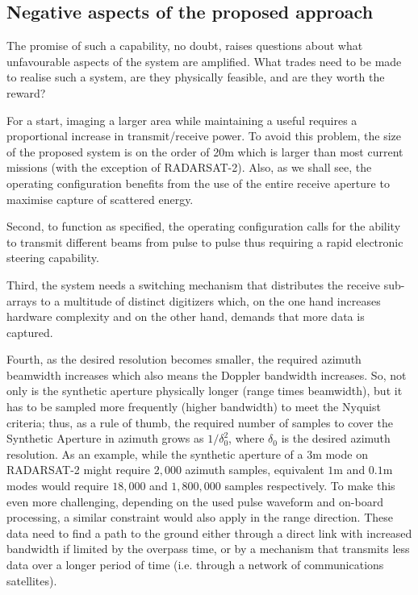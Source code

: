 \subsection{Negative aspects of the proposed approach}
The promise of such a capability, no doubt, raises questions about what unfavourable aspects of the system are amplified. What trades need to be made to realise such a system, are they physically feasible, and are they worth the reward? 
\par
For a start, imaging a larger area while maintaining a useful  requires a proportional increase in transmit/receive power. To avoid this problem, the size of the proposed system is on the order of 20m which is larger than most current missions (with the exception of RADARSAT-2). Also, as we shall see, the operating configuration benefits from the use of the entire receive aperture to maximise capture of scattered energy. 
\par
Second, to function as specified, the operating configuration calls for the ability to transmit different beams from pulse to pulse thus requiring a rapid electronic steering capability. 
\par
Third, the system needs a switching mechanism that distributes the receive sub-arrays to a multitude of distinct digitizers which, on the one hand increases hardware complexity and on the other hand, demands that more data is captured. 
\par
Fourth, as the desired resolution becomes smaller, the required azimuth beamwidth increases which also means the Doppler bandwidth increases. So, not only is the synthetic aperture physically longer (range times beamwidth), but it has to be sampled more frequently (higher bandwidth) to meet the Nyquist criteria; thus, as a rule of thumb, the required number of samples to cover the Synthetic Aperture in azimuth grows as $1/\delta_0^2$, where $\delta_0$ is the desired azimuth resolution. As an example, while the synthetic aperture of a $3\text{m}$ mode on RADARSAT-2 might require $2,000$ azimuth samples, equivalent $1\text{m}$ and $0.1\text{m}$ modes would require $18,000$ and $1,800,000$ samples respectively. To make this even more challenging, depending on the used pulse waveform and on-board processing, a similar constraint would also apply in the range direction. These data need to find a path to the ground either through a direct link with increased bandwidth if limited by the overpass time, or by a mechanism that transmits less data over a longer period of time (i.e. through a network of communications satellites).
